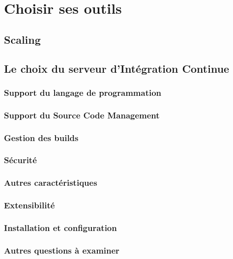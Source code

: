 \documentclass{report}
\begin{document}
      \section{Choisir ses outils}

        \subsection{Scaling}

        \subsection{Le choix du serveur d’Intégration Continue}
          \subsubsection{Support du langage de programmation}

          \subsubsection{Support du Source Code Management}

          \subsubsection{Gestion des builds}

          \subsubsection{Sécurité}

          \subsubsection{Autres caractéristiques}

          \subsubsection{Extensibilité}

          \subsubsection{Installation et configuration}

          \subsubsection{Autres questions à examiner}
\end{document}
